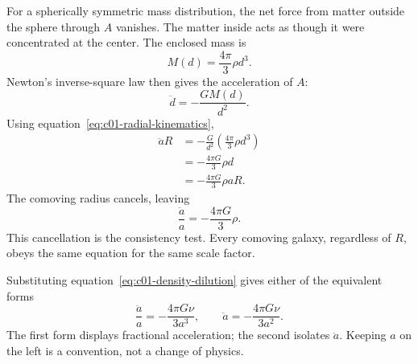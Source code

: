 For a spherically symmetric mass distribution, the net force from matter outside the sphere through \(A\) vanishes. The matter inside acts as though it were concentrated at the center. The enclosed mass is
\begin{equation}
M(d)=\frac{4\pi}{3}\rho d^3.
\label{eq:c01-enclosed-mass}
\end{equation}
Newton's inverse-square law then gives the acceleration of \(A\):
\begin{equation}
\ddot d=-\frac{GM(d)}{d^2}.
\end{equation}
Using equation~\eqref{eq:c01-radial-kinematics},
\begin{align}
\ddot a R
&=-\frac{G}{d^2}\left(\frac{4\pi}{3}\rho d^3\right) \\
&=-\frac{4\pi G}{3}\rho d \\
&=-\frac{4\pi G}{3}\rho aR.
\end{align}
The comoving radius cancels, leaving
\begin{equation}
\boxed{\frac{\ddot a}{a}=-\frac{4\pi G}{3}\rho.}
\label{eq:c01-acceleration}
\end{equation}
This cancellation is the consistency test. Every comoving galaxy, regardless of \(R\), obeys the same equation for the same scale factor.

Substituting equation~\eqref{eq:c01-density-dilution} gives either of the equivalent forms
\begin{equation}
\frac{\ddot a}{a}=-\frac{4\pi G\nu}{3a^3},
\qquad
\ddot a=-\frac{4\pi G\nu}{3a^2}.
\label{eq:c01-acceleration-nu}
\end{equation}
The first form displays fractional acceleration; the second isolates \(\ddot a\). Keeping \(a\) on the left is a convention, not a change of physics.

\begin{classroomqa}
\end{classroomqa}

